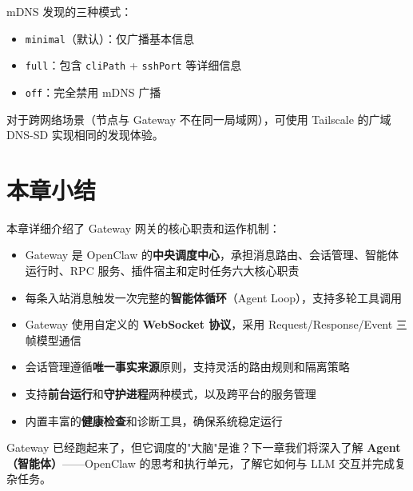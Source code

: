\noindent mDNS 发现的三种模式：

\begin{itemize}
  \item \texttt{minimal}（默认）：仅广播基本信息
  \item \texttt{full}：包含 \texttt{cliPath} + \texttt{sshPort} 等详细信息
  \item \texttt{off}：完全禁用 mDNS 广播
\end{itemize}

\noindent 对于跨网络场景（节点与 Gateway 不在同一局域网），可使用 Tailscale 的广域 DNS-SD
实现相同的发现体验。

\section{本章小结}

本章详细介绍了 Gateway 网关的核心职责和运作机制：

\begin{itemize}
  \item Gateway 是 OpenClaw 的\textbf{中央调度中心}，承担消息路由、会话管理、智能体运行时、RPC 服务、插件宿主和定时任务六大核心职责
  \item 每条入站消息触发一次完整的\textbf{智能体循环}（Agent Loop），支持多轮工具调用
  \item Gateway 使用自定义的 \textbf{WebSocket 协议}，采用 Request/Response/Event 三帧模型通信
  \item 会话管理遵循\textbf{唯一事实来源}原则，支持灵活的路由规则和隔离策略
  \item 支持\textbf{前台运行}和\textbf{守护进程}两种模式，以及跨平台的服务管理
  \item 内置丰富的\textbf{健康检查}和诊断工具，确保系统稳定运行
\end{itemize}

\noindent Gateway 已经跑起来了，但它调度的"大脑"是谁？下一章我们将深入了解 \textbf{Agent（智能体）}——OpenClaw 的思考和执行单元，了解它如何与 LLM 交互并完成复杂任务。
